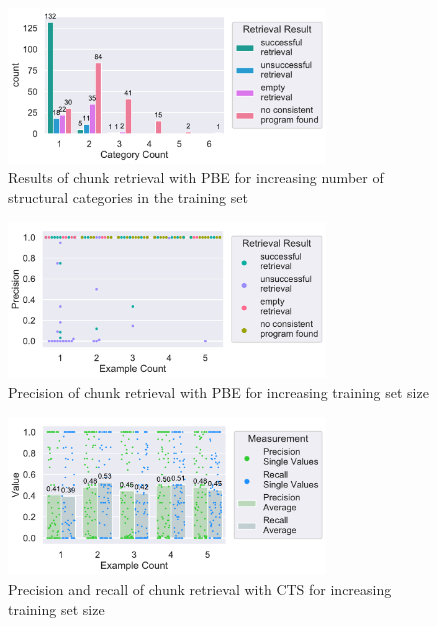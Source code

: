 \documentclass[\myrootdir/main.tex]{subfiles}
\begin{document}
\begin{figure}[htbp]
		\centering
		\includegraphics[width=0.75\textwidth, clip]{img/big-study/failure-reason-categorycount-PBE.pdf}
		\caption{Results of chunk retrieval with PBE for increasing number of structural categories in the training set}
		\label{fig:failure-reason-categorycount-PBE}
\end{figure}

\begin{figure}[htbp]
		\centering
		\includegraphics[width=0.75\textwidth, clip]{img/big-study/precision-extraction-result-PBE.pdf}
		\caption{Precision of chunk retrieval with PBE for increasing training set size}
		\label{fig:precision-extraction-result-PBE}
\end{figure}

\begin{figure}[htbp]
		\centering
		\includegraphics[width=0.75\textwidth, clip]{img/big-study/recall-precision-examplecount-CTS.pdf}
		\caption{Precision and recall of chunk retrieval with CTS for increasing training set size}
		\label{fig:recall-precision-examplecount-CTS}
\end{figure}
\end{document}
